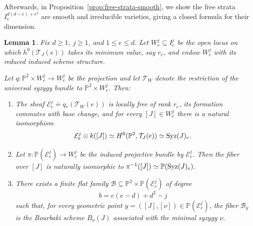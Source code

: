 \documentclass[11pt]{amsart} %
\newtheorem{Lemma}[Theorem]{Lemma}
\theoremstyle{definition}
\def\syz{\mbox{\rm Syz}}
\def\NZQ{\mathbb}               %
\def\PP{{\NZQ P}}
\def\T{{\mathcal T}}
\begin{document}
Afterwards, in Proposition~\ref{prop:free-strata-smooth}, we show the free strata $I_e^{d(d-e)+e^2}$ are smooth and irreducible varieties, giving a closed formula for their dimension. 

\begin{Lemma}\label{lem:universal-Bourbaki-construction}
Fix $d\geq1$, $j\geq1$, and $1\leq e\leq d$. Let \(W_e^j\subseteq I_e^j\) be the open locus on which
\(h^0(\T_J(e))\) takes its minimum value, say $r_e$, and endow $W_e^j$ with its reduced induced scheme
structure.

Let \(
q:\PP^2\times W_e^j\longrightarrow W_e^j\) be the projection and let $\T_W$ denote the restriction of the
universal syzygy bundle to $\PP^2\times W_e^j$. Then:

\begin{enumerate}
    \item[(a)] The sheaf \(\mathcal E_e^j \doteq q_*(\T_W(e))\)
    is locally free of rank $r_e$, its formation commutes with base
    change, and for every $[J] \in W_e^j$ there is a natural isomorphism 
    \[
    \mathcal E_e^j\otimes k([J])
    \simeq
    H^0(\PP^2,\T_J(e))
    \simeq
    \syz(J)_e.
    \]

    \item[(b)] Let \(\pi: \PP(\mathcal E_e^j)
    \longrightarrow W_e^j\) be the induced projective bundle by $\mathcal E_e^j$.
    Then the fiber over $[J]$ is naturally isomorphic to \(\pi^{-1}([J])\simeq\PP(\syz(J)_e)\).

    \item[(c)] There exists a finite flat family \(\mathcal B\subseteq\PP^2\times \PP(\mathcal{E}_e^j)\) of degree
    \[
    b=e(e-d)+d^2-j
    \]
    such that, for every geometric point $y=([J],[\nu])\in\PP(\mathcal E_e^j)$,
    the fiber $\mathcal B_y$ is the Bourbaki scheme
    $B_\nu(J)$ associated with the minimal syzygy $\nu$.
\end{enumerate}
\end{Lemma}
\end{document}

